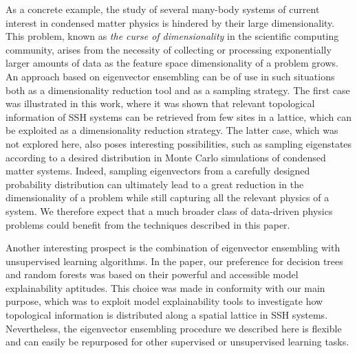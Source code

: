 \documentclass[10pt]{revtex4-1}
\begin{document}
As a concrete example, the study of several many-body systems of current interest in condensed matter physics is hindered by their large dimensionality. This problem, known as \emph{the curse of dimensionality} in the scientific computing community, arises from the necessity of collecting or processing exponentially larger amounts of data as the feature space dimensionality of a problem grows. An approach based on eigenvector ensembling can be of use in such situations both as a dimensionality reduction tool and as a sampling strategy. The first case was illustrated in this work, where it was shown that relevant topological information of SSH systems can be retrieved from few sites in a lattice, which can be exploited as a dimensionality reduction strategy. The latter case, which was not explored here, also poses interesting possibilities, such as sampling eigenstates according to a desired distribution in Monte Carlo simulations of condensed matter systems. Indeed, sampling eigenvectors from a carefully designed probability distribution can ultimately lead to a great reduction in the dimensionality of a problem while still capturing all the relevant physics of a system. We therefore expect that a much broader class of data-driven physics problems could benefit from the techniques described in this paper.

Another interesting prospect is the combination of eigenvector ensembling with unsupervised learning algorithms. In the paper, our preference for decision trees and random forests was based on their powerful and accessible model explainability aptitudes. This choice was made in conformity with our main purpose, which was to exploit model explainability tools to investigate how topological information is distributed along a spatial lattice in SSH systems. Nevertheless, the eigenvector ensembling procedure we described here is flexible and can easily be repurposed for other supervised or unsupervised learning tasks.
\end{document}
